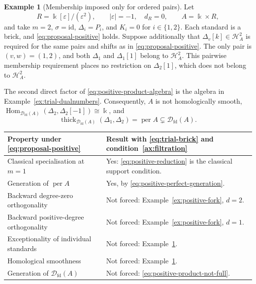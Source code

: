 \documentclass[11pt,a4paper]{article}
\newcommand{\D}{\mathcal D}
\renewcommand{\H}{\mathcal H}
\newcommand{\std}{\Delta}
\DeclareMathOperator{\fd}{fd}
\DeclareMathOperator{\Hom}{Hom}
\DeclareMathOperator{\thick}{thick}
\DeclareMathOperator{\per}{per}
\theoremstyle{plain}
\theoremstyle{definition}
\newtheorem{example}[theorem]{Example}
\numberwithin{equation}{section}
\begin{document}
\begin{example}[Membership imposed only for ordered pairs]
\label{ex:positive-pair-membership}
Let
\begin{equation}\label{eq:positive-product-algebra}
 R=\Bbbk[\varepsilon]/(\varepsilon^2),\qquad
 |\varepsilon|=-1,\quad d_R=0,\qquad
 A=\Bbbk\times R,
\end{equation}
and take $m=2$, $\sigma=\mathrm{id}$, $\std_i=P_i$, and $K_i=0$
for $i\in\{1,2\}$. Each standard is a brick, and
\eqref{eq:proposal-positive} holds. Suppose additionally that
$\std_v[k]\in\H_A^2$ is required for the same pairs and shifts as
in \eqref{eq:proposal-positive}. The only pair is $(v,w)=(1,2)$,
and both $\std_1$ and $\std_1[1]$ belong to $\H_A^2$.
This pairwise membership requirement places no restriction on
$\std_2[1]$, which does not belong to $\H_A^2$.

The second direct factor of \eqref{eq:positive-product-algebra}
is the algebra in Example~\ref{ex:trial-dualnumbers}. Consequently,
$A$ is not homologically smooth,
$\Hom_{\D_{\fd}(A)}(\std_2,\std_2[-1])\cong\Bbbk$, and
\begin{equation}\label{eq:positive-product-not-full}
 \thick_{\D_{\fd}(A)}(\std_1,\std_2)
 =\per A\subsetneq\D_{\fd}(A).
\end{equation}
\end{example}

\begin{center}\small
\begin{tabularx}{\linewidth}{@{}>{\raggedright\arraybackslash}p{.36\linewidth}>{\raggedright\arraybackslash}X@{}}
\toprule
Property under \eqref{eq:proposal-positive} & Result with
\eqref{eq:trial-brick} and condition~\ref{ax:filtration} \\
\midrule
Classical specialisation at $m=1$
 & Yes: \eqref{eq:positive-reduction} is the classical support condition. \\
Generation of $\per A$
 & Yes, by \eqref{eq:positive-perfect-generation}. \\
Backward degree-zero orthogonality
 & Not forced: Example~\ref{ex:positive-fork}, $d=2$. \\
Backward positive-degree orthogonality
 & Not forced: Example~\ref{ex:positive-fork}, $d=1$. \\
Exceptionality of individual standards
 & Not forced: Example~\ref{ex:positive-pair-membership}. \\
Homological smoothness
 & Not forced: Example~\ref{ex:positive-pair-membership}. \\
Generation of $\D_{\fd}(A)$
 & Not forced: \eqref{eq:positive-product-not-full}. \\
\bottomrule
\end{tabularx}
\end{center}
\end{document}
